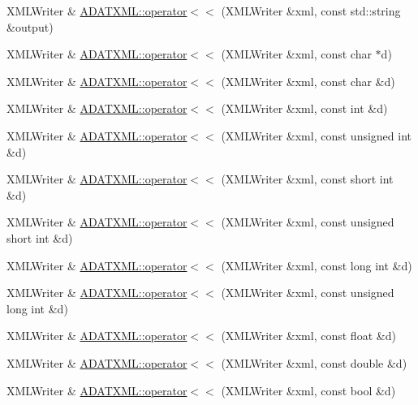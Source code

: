 \begin{DoxyCompactItemize}
\item 
X\+M\+L\+Writer \& \mbox{\hyperlink{group__io_gaf8d83226be4c0dca61d0f9d2cad6f57b}{A\+D\+A\+T\+X\+M\+L\+::operator$<$$<$}} (X\+M\+L\+Writer \&xml, const std\+::string \&output)
\item 
X\+M\+L\+Writer \& \mbox{\hyperlink{group__io_ga1e77b0f38cdffd40d5f5d947a4527bb4}{A\+D\+A\+T\+X\+M\+L\+::operator$<$$<$}} (X\+M\+L\+Writer \&xml, const char $\ast$d)
\item 
X\+M\+L\+Writer \& \mbox{\hyperlink{group__io_gaaf7119c0afc1e8701f12daa5d349ae00}{A\+D\+A\+T\+X\+M\+L\+::operator$<$$<$}} (X\+M\+L\+Writer \&xml, const char \&d)
\item 
X\+M\+L\+Writer \& \mbox{\hyperlink{group__io_gab642b539df5696daa03675faadf87dfc}{A\+D\+A\+T\+X\+M\+L\+::operator$<$$<$}} (X\+M\+L\+Writer \&xml, const int \&d)
\item 
X\+M\+L\+Writer \& \mbox{\hyperlink{group__io_ga24986bf3413f6b83f58f5941f2c68db7}{A\+D\+A\+T\+X\+M\+L\+::operator$<$$<$}} (X\+M\+L\+Writer \&xml, const unsigned int \&d)
\item 
X\+M\+L\+Writer \& \mbox{\hyperlink{group__io_ga2892faecb11d9475723b52bcae10aa04}{A\+D\+A\+T\+X\+M\+L\+::operator$<$$<$}} (X\+M\+L\+Writer \&xml, const short int \&d)
\item 
X\+M\+L\+Writer \& \mbox{\hyperlink{group__io_gac4bf68c17fbdb50450cfa2d338d09685}{A\+D\+A\+T\+X\+M\+L\+::operator$<$$<$}} (X\+M\+L\+Writer \&xml, const unsigned short int \&d)
\item 
X\+M\+L\+Writer \& \mbox{\hyperlink{group__io_gadc0e2c541a279b5a007e13f6f73ecf45}{A\+D\+A\+T\+X\+M\+L\+::operator$<$$<$}} (X\+M\+L\+Writer \&xml, const long int \&d)
\item 
X\+M\+L\+Writer \& \mbox{\hyperlink{group__io_gaaf0b05a50d9a15119bf89b91d941b9d2}{A\+D\+A\+T\+X\+M\+L\+::operator$<$$<$}} (X\+M\+L\+Writer \&xml, const unsigned long int \&d)
\item 
X\+M\+L\+Writer \& \mbox{\hyperlink{group__io_ga5bf37d07fe43369189518f64fd8ca05d}{A\+D\+A\+T\+X\+M\+L\+::operator$<$$<$}} (X\+M\+L\+Writer \&xml, const float \&d)
\item 
X\+M\+L\+Writer \& \mbox{\hyperlink{group__io_ga3325d0cff5609ce8a1d74b516e9dfcf8}{A\+D\+A\+T\+X\+M\+L\+::operator$<$$<$}} (X\+M\+L\+Writer \&xml, const double \&d)
\item 
X\+M\+L\+Writer \& \mbox{\hyperlink{group__io_ga9d2ed7a5f0ca12a3b4f993f19ee4473e}{A\+D\+A\+T\+X\+M\+L\+::operator$<$$<$}} (X\+M\+L\+Writer \&xml, const bool \&d)
\item 

\end{DoxyCompactItemize}
